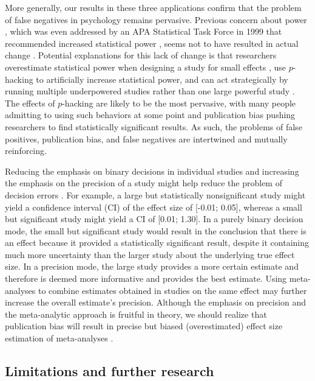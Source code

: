 \documentclass{article}
\begin{document}
More generally, our results in these three applications confirm that the problem of false negatives in psychology remains pervasive. Previous concern about power \cite{Cohen1962-jc,Sedlmeier1989-yc,Bakker2012-tf,Marszalek2011-rf}, which was even addressed by an APA Statistical Task Force in 1999 that recommended increased statistical power \cite{Wilkinson_APA_Task_Force_on_Statistical_Inference1999-ht}, seems not to have resulted in actual change \cite{Marszalek2011-rf}. Potential explanations for this lack of change is that researchers overestimate statistical power when designing a study for small effects \cite{Bakker2016-nj}, use $p$-hacking to artificially increase statistical power, and can act strategically by running multiple underpowered studies rather than one large powerful study \cite{Bakker2012-tf}. The effects of $p$-hacking are likely to be the most pervasive, with many people admitting to using such behaviors at some point \cite{John2012-uj} and publication bias pushing researchers to find statistically significant results. As such, the problems of false positives, publication bias, and false negatives are intertwined and mutually reinforcing.

Reducing the emphasis on binary decisions in individual studies and increasing the emphasis on the precision of a study might help reduce the problem of decision errors \cite{Cumming2014-fi}. For example, a large but statistically nonsignificant study might yield a confidence interval (CI) of the effect size of [-0.01; 0.05], whereas a small but significant study might yield a CI of [0.01; 1.30]. In a purely binary decision mode, the small but significant study would result in the conclusion that there is an effect because it provided a statistically significant result, despite it containing much more uncertainty than the larger study about the underlying true effect size. In a precision mode, the large study provides a more certain estimate and therefore is deemed more informative and provides the best estimate. Using meta-analyses to combine estimates obtained in studies on the same effect may further increase the overall estimate's precision. Although the emphasis on precision and the meta-analytic approach is fruitful in theory, we should realize that publication bias will result in precise but biased (overestimated) effect size estimation of meta-analyses \cite{Nuijten2015-kh}.

\subsection*{Limitations and further research}
\end{document}
